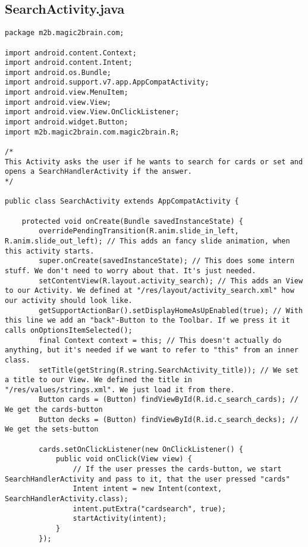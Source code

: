 \subsection*{SearchActivity.java}
\begin{lstlisting}
package m2b.magic2brain.com;

import android.content.Context;
import android.content.Intent;
import android.os.Bundle;
import android.support.v7.app.AppCompatActivity;
import android.view.MenuItem;
import android.view.View;
import android.view.View.OnClickListener;
import android.widget.Button;
import m2b.magic2brain.com.magic2brain.R;

/*
This Activity asks the user if he wants to search for cards or set and opens a SearchHandlerActivity if the answer.
*/

public class SearchActivity extends AppCompatActivity {

    protected void onCreate(Bundle savedInstanceState) {
        overridePendingTransition(R.anim.slide_in_left, R.anim.slide_out_left); // This adds an fancy slide animation, when this activity starts.
        super.onCreate(savedInstanceState); // This does some intern stuff. We don't need to worry about that. It's just needed.
        setContentView(R.layout.activity_search); // This adds an View to our Activity. We defined at "/res/layout/activity_search.xml" how our activity should look like.
        getSupportActionBar().setDisplayHomeAsUpEnabled(true); // With this line we add an "back"-Button to the Toolbar. If we press it it calls onOptionsItemSelected();
        final Context context = this; // This doesn't actually do anything, but it's needed if we want to refer to "this" from an inner class.
        setTitle(getString(R.string.SearchActivity_title)); // We set a title to our View. We defined the title in "/res/values/strings.xml". We just load it from there.
        Button cards = (Button) findViewById(R.id.c_search_cards); // We get the cards-button
        Button decks = (Button) findViewById(R.id.c_search_decks); // We get the sets-button

        cards.setOnClickListener(new OnClickListener() {
            public void onClick(View view) {
                // If the user presses the cards-button, we start SearchHandlerActivity and pass to it, that the user pressed "cards"
                Intent intent = new Intent(context, SearchHandlerActivity.class);
                intent.putExtra("cardsearch", true);
                startActivity(intent);
            }
        });


\end{lstlisting}
